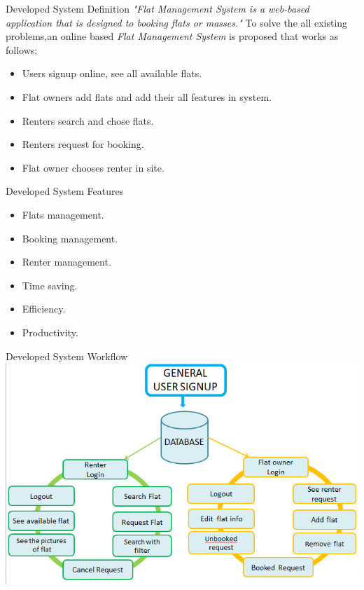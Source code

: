 \documentclass{beamer}
\begin{document}
\begin{frame}[t]{Developed System Definition}
\textit{"Flat Management System is a web-based application that is designed to booking flats or masses."}
To solve the all existing problems,an online based \textit{Flat Management System} is proposed that works as follows:
\begin{itemize}
\item Users signup online, see all available flats.%
\item Flat owners add flats and add their all features in system. %
\item Renters search and chose flats.
\item Renters request for booking.%
\item Flat owner chooses renter in site.%

 

\end{itemize}
\end{frame}
\begin{frame} {Developed System Features}

\begin{itemize}
    \item Flats management.
    \item Booking management.
    \item Renter management.
    \item Time saving.
    \item Efficiency.
    \item Productivity.
\end{itemize}

\end{frame}
\begin{frame}{Developed System Workflow}
\includegraphics[height=6 cm,width=10 cm]{Screenshot (15).png}
\end{frame}
\end{document}
